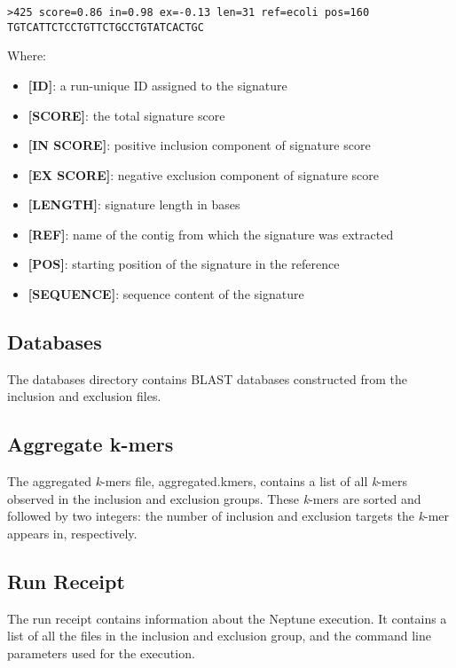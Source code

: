 \documentclass[a4paper,10pt]{article}
\begin{document}
\begin{verbatim}
>425 score=0.86 in=0.98 ex=-0.13 len=31 ref=ecoli pos=160
TGTCATTCTCCTGTTCTGCCTGTATCACTGC
\end{verbatim}

Where:

\begin{itemize}
  \item \textbf{[ID]}: a run-unique ID assigned to the signature
  \item \textbf{[SCORE]}: the total signature score
  \item \textbf{[IN SCORE]}: positive inclusion component of signature score
  \item \textbf{[EX SCORE]}: negative exclusion component of signature score
  \item \textbf{[LENGTH]}: signature length in bases
  \item \textbf{[REF]}: name of the contig from which the signature was extracted
  \item \textbf{[POS]}: starting position of the signature in the reference
  \item \textbf{[SEQUENCE]}: sequence content of the signature
\end{itemize}

\subsection{Databases}

The databases directory contains BLAST databases constructed from the inclusion and exclusion files.

\subsection{Aggregate k-mers}

The aggregated \textit{k}-mers file, aggregated.kmers, contains a list of all \textit{k}-mers observed in the inclusion and exclusion groups. These \textit{k}-mers are sorted and followed by two integers: the number of inclusion and exclusion targets the \textit{k}-mer appears in, respectively.

\subsection{Run Receipt}

The run receipt contains information about the Neptune execution. It contains a list of all the files in the inclusion and exclusion group, and the command line parameters used for the execution.
\end{document}
